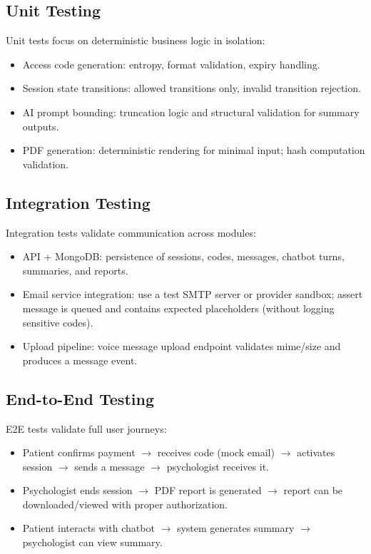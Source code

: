 \documentclass[12pt]{article}
\begin{document}
\subsection{Unit Testing}
Unit tests focus on deterministic business logic in isolation:
\begin{itemize}[leftmargin=*]
  \item Access code generation: entropy, format validation, expiry handling.
  \item Session state transitions: allowed transitions only, invalid transition rejection.
  \item AI prompt bounding: truncation logic and structural validation for summary outputs.
  \item PDF generation: deterministic rendering for minimal input; hash computation validation.
\end{itemize}

\subsection{Integration Testing}
Integration tests validate communication across modules:
\begin{itemize}[leftmargin=*]
  \item API + MongoDB: persistence of sessions, codes, messages, chatbot turns, summaries, and reports.
  \item Email service integration: use a test SMTP server or provider sandbox; assert message is queued and contains expected placeholders (without logging sensitive codes).
  \item Upload pipeline: voice message upload endpoint validates mime/size and produces a message event.
\end{itemize}

\subsection{End-to-End Testing}
E2E tests validate full user journeys:
\begin{itemize}[leftmargin=*]
  \item Patient confirms payment $\rightarrow$ receives code (mock email) $\rightarrow$ activates session $\rightarrow$ sends a message $\rightarrow$ psychologist receives it.
  \item Psychologist ends session $\rightarrow$ PDF report is generated $\rightarrow$ report can be downloaded/viewed with proper authorization.
  \item Patient interacts with chatbot $\rightarrow$ system generates summary $\rightarrow$ psychologist can view summary.
\end{itemize}
\end{document}
